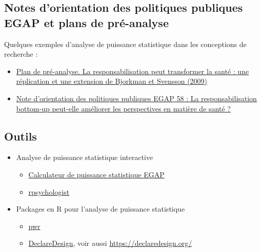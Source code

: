 \documentclass[12pt,]{book}
\begin{document}
\hypertarget{notes-dorientation-des-politiques-publiques-egap-et-plans-de-pruxe9-analyse}{%
\subsection{Notes d'orientation des politiques publiques EGAP et plans de pré-analyse}\label{notes-dorientation-des-politiques-publiques-egap-et-plans-de-pruxe9-analyse}}

Quelques exemples d'analyse de puissance statistique dans les conceptions de recherche :

\begin{itemize}
\item
  \href{https://osf.io/qxwmu/}{Plan de pré-analyse. La responsabilisation peut transformer la santé : une réplication et une extension de Bjorkman et Svensson (2009)}
\item
  \href{https://egap.org/resource/does-bottom-up-accountability-work-evidence-from-uganda/}{Note d'orientation des politiques publiques EGAP 58 : La responsabilisation bottom-up peut-elle améliorer les perspectives en matière de santé ?}
\end{itemize}

\hypertarget{outils-3}{%
\subsection{Outils}\label{outils-3}}

\begin{itemize}
\item
  Analyse de puissance statistique interactive

  \begin{itemize}
  \item
    \href{https://egap.shinyapps.io/power-app/}{Calculateur de puissance statistique EGAP}
  \item
    \href{https://rpsychologist.com/d3/NHST/}{rpsychologist}
  \end{itemize}
\item
  Packages en R pour l'analyse de puissance statistique

  \begin{itemize}
  \item
    \href{https://cran.r-project.org/web/packages/pwr/index.html}{pwr}
  \item
    \href{https://cran.r-project.org/web/packages/DeclareDesign/index.html}{DeclareDesign}, voir aussi \url{https://declaredesign.org/}
  \end{itemize}
\end{itemize}
\end{document}
